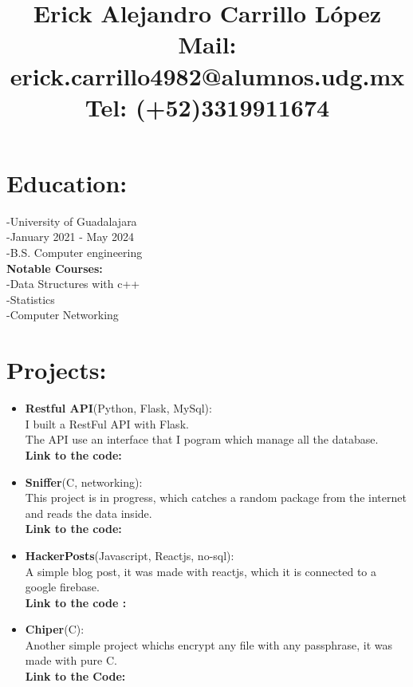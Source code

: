 \documentclass{article}
\title{\textbf{Erick Alejandro Carrillo López} \\
\textbf{Mail:} erick.carrillo4982@alumnos.udg.mx\\
\textbf{Tel:} (+52)3319911674
}
\date{}
\begin{document}
\maketitle

\begin{minipage}[t]{8cm}
\vspace*{-2cm}
\section*{Education:}
-University of Guadalajara\\
-January 2021 - May 2024\\
-B.S. Computer engineering\\
\textbf{Notable Courses:}\\
    -Data Structures with c++\\
    -Statistics\\
    -Computer Networking
\section*{Projects:}
\begin{itemize}
    \item \textbf{Restful API}(Python, Flask, MySql):\\
    I built a RestFul API with Flask.\\
    The API use an interface that I pogram which manage all the database.\\
    \textbf{Link to the code:} \href{https://github.com/alecksandr26/Flask-restful-api}{\color{Blue}{GitHub}}
    \item \textbf{Sniffer}(C, networking):\\
      This project is in progress, which catches a random package from the internet and reads the data inside.\\
        \textbf{Link to the code:} \href{https://github.com/alecksandr26/sniffer}{\color{Blue}{GitHub}}
    
    \item \textbf{HackerPosts}(Javascript, Reactjs, no-sql):\\
        A simple blog post, it was made with reactjs, which it is connected to a google firebase.\\
        \textbf{Link to the code :} \href{https://github.com/alecksandr26/Hacker-Posts}{\color{Blue}{GitHub}}
    \item \textbf{Chiper}(C): \\
        Another simple project whichs encrypt any file with any passphrase, it was made with pure C.\\
        \textbf{Link to the Code:} \href{https://github.com/alecksandr26/cipher}{\color{Blue}{GitHub}}
\end{itemize}

\end{minipage}
\end{document}
